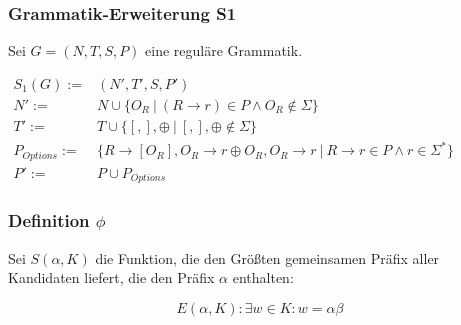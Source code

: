 \documentclass[]{article}
\begin{document}
% 
%     

\subsubsection*{Grammatik-Erweiterung S1}


Sei $G = (N,T,S,P)$ eine reguläre Grammatik.


$
\begin{array}{rl}
  S_1(G) :=& (N', T', S, P') \\
  N' :=& N \cup \{ O_R\ |\ (R\rightarrow r)\in P\land O_R \notin \Sigma\}\\
  T' :=& T \cup \{[ , ], \oplus\ |\ [,],\oplus\notin \Sigma \}\\
  P_{Options} :=& \{R \rightarrow [O_R], O_R \rightarrow r\oplus O_R, O_R \rightarrow r \ \vert\ R\rightarrow r\in P \land r\in \Sigma^*\} \\
  P' :=& P \cup P_{Options} 
\end{array}
$

\subsubsection*{Definition $\phi$}



Sei $S(\alpha,K)$ die Funktion, die den Größten gemeinsamen Präfix aller Kandidaten liefert, die den Präfix $\alpha$ enthalten:

\[ E(\alpha, K) : \exists w\in K: w=\alpha\beta \] 
\end{document}
